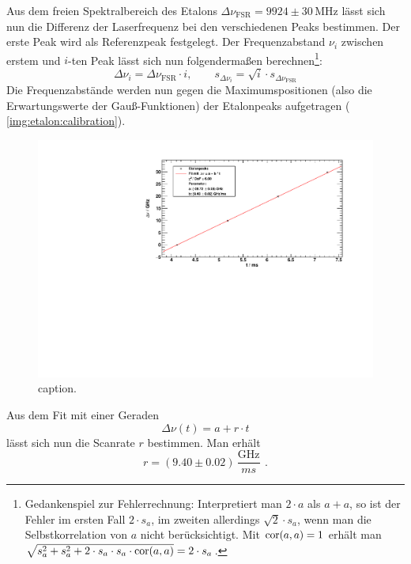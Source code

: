 Aus dem freien Spektralbereich des Etalons $\Delta \nu_\text{FSR} = 9924 \pm 30\,\text{MHz}$ lässt sich nun die Differenz der Laserfrequenz bei den verschiedenen 
Peaks bestimmen. Der erste Peak wird als Referenzpeak festgelegt. Der Frequenzabstand $\nu_i$ zwischen erstem und $i$-ten Peak lässt sich nun 
folgendermaßen berechnen\footnote{Gedankenspiel zur Fehlerrechnung: Interpretiert man $2 \cdot a$ als $a + a$, so ist der Fehler im ersten Fall $2 \cdot s_a$, im zweiten 
allerdings $\sqrt{2} \cdot s_a$, wenn man die Selbstkorrelation von $a$ nicht berücksichtigt. Mit $\operatorname{cor}(a, a) = 1$ 
erhält man $\sqrt{s_a^2 + s_a^2 + 2 \cdot s_a \cdot s_a \cdot \operatorname{cor}(a, a)} = 2 \cdot s_a$.}: 
\begin{equation}
    \Delta \nu_i = \Delta \nu_\text{FSR} \cdot i, \qquad s_{\Delta \nu_i} = \sqrt{i} \cdot s_{\Delta \nu_\text{FSR}} 
\end{equation}
Die Frequenzabstände werden nun gegen die Maximumspositionen (also die Erwartungswerte der Gauß-Funktionen) der Etalonpeaks aufgetragen ( \autoref{img:etalon:calibration}).
\begin{figure}[H]
\begin{center}
  \includegraphics[width=\textwidth]{../img/part2/up-etalon_zoom-etalon_calibration.pdf}
  \caption{caption.}
  \label{img:etalon:calibration}
\end{center}
\end{figure}
Aus dem Fit mit einer Geraden 
\begin{equation}
    \Delta \nu(t) = a + r \cdot t  %
\end{equation}
lässt sich nun die Scanrate $r$ bestimmen. Man erhält %
\begin{equation}
    r = (9.40 \pm 0.02)\,\frac{\text{GHz}}{ms}\ \, .
\end{equation}

